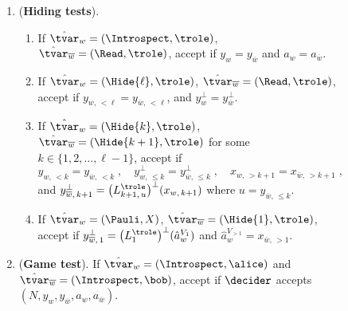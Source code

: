 \begin{figure}[!htbp]
\begin{gamespec}
\begin{enumerate}[itemsep=2pt, parsep=2pt]
\begin{enumerate}
      \item If $\hat{\tvar}_w = (\Introspect, \trole)$,
        $\hat{\tvar}_{\overline{w}} = (\Sample, \trole)$, accept if $y_{w} =
        L^\trole(z_{\overline{w}})$ and $a_w=a_{\overline{w}}$.
        \label{enu:sampling-intro}
      \end{enumerate}

    \item (\textbf{Hiding tests}).
      \label{enu:hiding}
      \begin{enumerate}

      \item If $\hat{\tvar}_w = (\Introspect, \trole)$,
        $\hat{\tvar}_{\overline{w}} = (\Read, \trole)$, accept if $y_{w} =
        y_{\overline{w}}$ and $a_w = a_{\overline{w}}$.
        \label{enu:hiding-intro}

      \item If $\hat{\tvar}_w = (\Hide{\ell}, \trole)$,
        $\hat{\tvar}_{\overline{w}} = (\Read, \trole)$, accept if $y_{w,\,
          <\ell} = y_{\overline{w},\, <\ell}$, and $y^{\perp}_w =
        y^{\perp}_{\overline{w}}$.
        \label{enu:hiding-read}
        
      \item \label{enu:hiding-same} If $\hat{\tvar}_w = (\Hide{k}, \trole)$,
        $\hat{\tvar}_{\overline{w}} = (\Hide{k+1}, \trole)$ for some $k \in \{ 1,
        2, \ldots, \ell-1 \}$, accept if
        \begin{equation*}
          y_{w,\, <k} = y_{\overline{w},\, <k}\;, \quad
          y^{\perp}_{w,\, \le k} = y^{\perp}_{\overline{w},\, \le k}\;, \quad
          x_{w,\, >k+1} = x_{\overline{w},\, >k+1}\;,
        \end{equation*}
        and $y^{\perp}_{\overline{w},\, k+1} = \big( L^{\trole}_{k+1,\, u} \big)^\perp
        (x_{w,\, k+1})$ where $u = y_{\overline{w},\, \le k}$.
      \item If $\hat{\tvar}_w = (\Pauli,X)$, $\hat{\tvar}_{\overline{w}} =
        (\Hide{1}, \trole)$, accept if $y^\perp_{\overline{w},\, 1} =
        \bigl( L^{\trole}_1 \bigr)^\perp (\hat{a}_w^{V_1})$ and $\hat{a}_w^{V_{> 1}} =
        x_{\overline{w},\, >1}$.
        \label{enu:hiding-pauli}
      \end{enumerate}

    \item (\textbf{Game test}).
      \label{enu:intro-game}
      If $\hat{\tvar}_w = (\Introspect, \alice)$ and $\hat{\tvar}_{\overline{w}}
      = (\Introspect, \bob)$, accept if $\decider$ accepts $(N, y_w,
      y_{\overline{w}}, a_w, a_{\overline{w}})$.


\end{enumerate}
\end{gamespec}
\end{figure}
